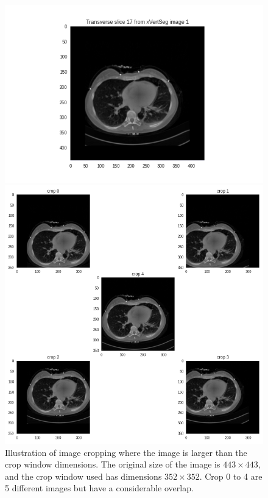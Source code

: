\begin{figure}
    \centering
    \begin{minipage}{.99\textwidth}
        \includegraphics[width=.99\textwidth]{images/slice017.png}
    \end{minipage} 
    \begin{minipage}{0.99\textwidth}
        \includegraphics[width=.99\textwidth]{images/cropping_slice017.png}
    \end{minipage}
    \caption{
        Illustration of image cropping where the image is larger than the crop window dimensions. The original size of the image is $443 \times 443$, and the crop window used has dimensions $352 \times 352$.
        Crop 0 to 4 are 5 different images but have a considerable overlap. \label{fig:crop}
        }
    
\end{figure}

